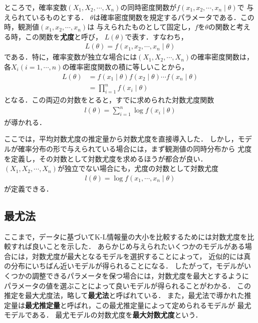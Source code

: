 ところで，確率変数$(X_1, X_2, \cdots, X_n)$の同時密度関数が$f(x_1, x_2, \cdots, x_n \mid \theta)$で
与えられているものとする．
$\theta$は確率密度関数を規定するパラメータである．この時，観測値$(x_1, x_2, \cdots, x_n)$は
与えられたものとして固定し，$f$を$\theta$の関数と考える時，この関数を\textbf{尤度}と呼び，
$L(\theta)$で表す．すなわち，
\begin{align}
  L(\theta) = f(x_1, x_2, \cdots, x_n \mid \theta)
\end{align}
である．特に，確率変数が独立な場合には$(X_1, X_2, \cdots, X_n)$の確率密度関数は，
各$X_i (i = 1, \cdots, n)$の確率密度関数の積に等しいことから，
\begin{align}
  L(\theta) &= f(x_1 \mid \theta)f(x_2 \mid \theta) \cdots f(x_n \mid \theta)\\\nonumber
  &= \prod_{i=1}^{n}f(x_i \mid \theta)
\end{align}
となる．この両辺の対数をとると，すでに求められた対数尤度関数
\begin{align}
  l(\theta) = \sum_{i=1}^{n}\log f(x_i \mid \theta)
\end{align}
が導かれる．

ここでは，平均対数尤度の推定量から対数尤度を直接導入した．
しかし，モデルが確率分布の形で与えられている場合には，まず観測値の同時分布から
尤度を定義し，その対数として対数尤度を求めるほうが都合が良い．
$(X_1, X_2, \cdots, X_n)$が独立でない場合にも，尤度の対数として対数尤度
\begin{align}
  l(\theta) = \log f(x_1, \cdots, x_n \mid \theta)
\end{align}
が定義できる．

\subsection{最尤法}
ここまで，データに基づいてK-L情報量の大小を比較するためには対数尤度を比較すれば良いことを示した．
あらかじめ与えられたいくつかのモデルがある場合には，対数尤度が最大となるモデルを選択することによって，
近似的には真の分布にいちばん近いモデルが得られることになる．
したがって，モデルがいくつかの調整できるパラメータを保つ場合には，対数尤度を最大とするように
パラメータの値を選ぶことによって良いモデルが得られることがわかる．
この推定を最大尤度法，略して\textbf{最尤法}と呼ばれている．
また，最尤法で導かれた推定量は\textbf{最尤推定量}と呼ばれ，この最尤推定量によって定められるモデルが
最尤モデルである．
最尤モデルの対数尤度を\textbf{最大対数尤度}という．
